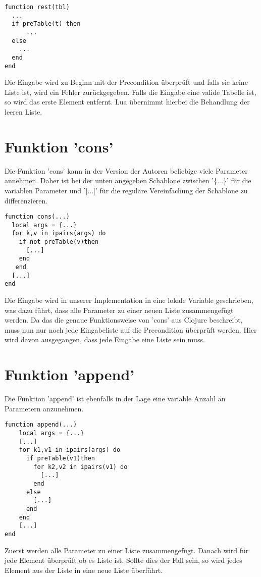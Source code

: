 \begin{lstlisting}
function rest(tbl)
  ...
  if preTable(t) then
      ...
  else
    ...
  end
end
\end{lstlisting}

Die Eingabe wird zu Beginn mit der Precondition überprüft und falls sie keine Liste ist, wird ein Fehler zurückgegeben. Falls die Eingabe eine valide Tabelle ist, so wird das erste Element entfernt. Lua übernimmt hierbei die Behandlung der leeren Liste.


\section{Funktion 'cons'}
Die Funktion 'cons' kann in der Version der Autoren beliebige viele Parameter annehmen. Daher ist bei der unten angegeben Schablone zwischen '\{...\}' für die variablen Parameter und '[...]' für die reguläre Vereinfachung der Schablone zu differenzieren.

\begin{lstlisting}
function cons(...)
  local args = {...}
  for k,v in ipairs(args) do
    if not preTable(v)then
      [...]
    end
   end
  [...]
end
\end{lstlisting}

Die Eingabe wird in unserer Implementation in eine lokale Variable geschrieben, was dazu führt, dass alle Parameter zu einer neuen Liste zusammengefügt werden. Da das die genaue Funktionsweise von 'cons' aus Clojure beschreibt, muss nun nur noch jede Eingabeliste auf die Precondition überprüft werden. Hier wird davon ausgegangen, dass jede Eingabe eine Liste sein muss.

\section{Funktion 'append'}
Die Funktion 'append' ist ebenfalls in der Lage eine variable Anzahl an Parametern anzunehmen.

\begin{lstlisting}
function append(...)
    local args = {...}
    [...]
    for k1,v1 in ipairs(args) do
      if preTable(v1)then
        for k2,v2 in ipairs(v1) do 
          [...]
        end
      else
        [...]
      end
    end
    [...]
end
\end{lstlisting}

Zuerst werden alle Parameter zu einer Liste zusammengefügt. Danach wird für jede Element überprüft ob es Liste ist. Sollte dies der Fall sein, so wird jedes Element aus der Liste in eine neue Liste überführt.

